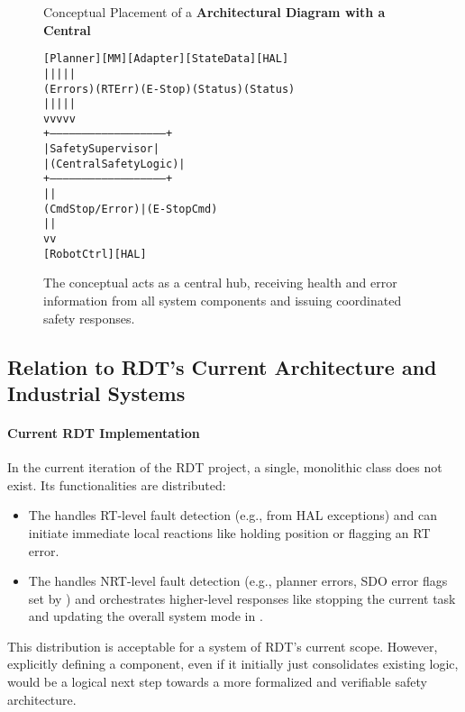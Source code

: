 \begin{figure}[h!]
    \centering
    \begin{infobox}{Conceptual Placement of a }
        \textbf{Architectural Diagram with a Central }

        {\footnotesize
        \begin{alltt}
 [Planner]   [MM]    [Adapter]   [StateData]    [HAL]
     |         |         |           |            |
(Errors) (RT Err) (E-Stop)   (Status)    (Status)
     |         |         |           |            |
     v         v         v           v            v
+-----------------------------------------------------+
|                SafetySupervisor                     |
|                (Central Safety Logic)               |
+-----------------------------------------------------+
        |                        |
(Cmd Stop/Error)                 | (E-Stop Cmd)
        |                        |
        v                        v
   [RobotCtrl]                  [HAL]
        \end{alltt}
        }
    \end{infobox}
            \vspace{0.3cm}
    \caption{The conceptual  acts as a central hub, receiving health and error information from all system components and issuing coordinated safety responses.}
    \label{fig:safety-supervisor-conceptual}
\end{figure}

\subsection{Relation to RDT's Current Architecture and Industrial Systems}
\label{subsec:safety_supervisor_rdt_industrial}

\paragraph{Current RDT Implementation}
In the current iteration of the RDT project, a single, monolithic  class does not exist. Its functionalities are distributed:
\begin{itemize}
    \item The  handles RT-level fault detection (e.g., from HAL exceptions) and can initiate immediate local reactions like holding position or flagging an RT error.
    \item The  handles NRT-level fault detection (e.g., planner errors, SDO error flags set by ) and orchestrates higher-level responses like stopping the current task and updating the overall system mode in .
\end{itemize}
This distribution is acceptable for a system of RDT's current scope. However, explicitly defining a  component, even if it initially just consolidates existing logic, would be a logical next step towards a more formalized and verifiable safety architecture.

